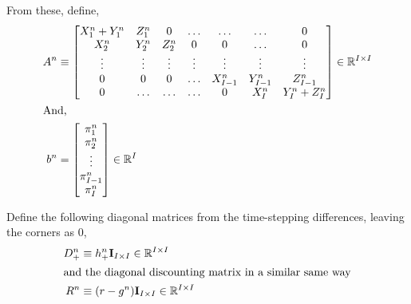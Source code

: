 \documentclass[11pt]{article}
\newcommand{\R}{\ensuremath{\mathbb{R}}}
\begin{document}
From these, define,
\begin{align}
		A^n &\equiv \begin{bmatrix}
	X_{1}^n+Y_1^n & Z_1^n & 0 & \ldots & \ldots & \ldots & 0\\
	X^n_2 & Y^n_2 & Z^n_2 & 0 & 0 & \ldots & 0\\
	\vdots & \vdots & \vdots & \vdots & \vdots & \vdots & \vdots\\		
	0 & 0 & 0 & \ldots & X^n_{I-1} & Y^n_{I-1} & Z^n_{I-1}\\
	0 & \ldots & \ldots & \ldots & 0 & X_I^n & Y_I^n+Z_I^n
\end{bmatrix}\in\R^{I\times I}\label{eq:A-n}\\
\intertext{And,}
b^n &= \begin{bmatrix} \pi^n_{1} \\
\pi^n_{2}\\
\vdots\\
\pi^n_{I-1}\\
\pi^n_{I}\end{bmatrix}\in\R^{I}\label{eq:b-n}\\
\end{align}

Define the following diagonal matrices from the time-stepping differences, leaving the corners as $0$,
\begin{align}
D_{+}^n &\equiv h_{+}^n\mathbf{I}_{I\times I} \in \R^{I\times I}\label{eq:D-n}\\
\intertext{and the diagonal discounting matrix in a similar same way}
R^n&\equiv (r-g^{n}) \mathbf{I}_{I\times I} \in \R^{I\times I}\label{eq:R-n}\\
\end{align}
\end{document}
